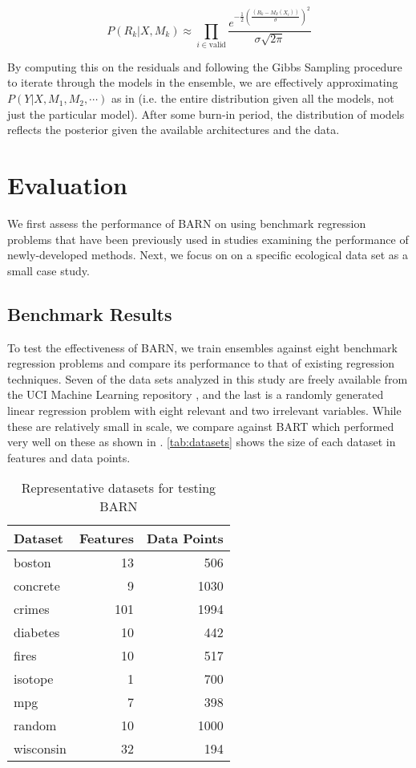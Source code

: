 \documentclass[12pt]{article}
\begin{document}
$$
P(R_k|X,M_k) \approx \prod_{i \in \text{valid}} \frac{e^{-\frac{1}{2}\left(\frac{(R_k-M_k(X_i))}{\sigma}\right)^2}}{\sigma \sqrt{2\pi}}
$$

By computing this on the residuals and following the Gibbs Sampling procedure to iterate through the models in the ensemble, we are effectively approximating $P(Y|X,M_1,M_2,\cdots)$ as in \cite{chipman2010bart} (i.e. the entire distribution given all the models, not just the particular model).  After some burn-in period, the distribution of models reflects the posterior given the available architectures and the data.

\section{Evaluation}\label{sec:eval}

We first assess the performance of BARN on using benchmark regression problems that have been previously used in studies examining the performance of newly-developed methods. Next, we focus on on a specific ecological data set as a small case study.

\subsection{Benchmark Results}\label{subsec:res}

To test the effectiveness of BARN, we train ensembles against eight benchmark regression problems and compare its performance to that of existing regression techniques.  Seven of the data sets analyzed in this study are freely available from the UCI Machine Learning repository \cite{Dua:2019}, and the last is a randomly generated linear regression problem with eight relevant and two irrelevant variables.  While these are relatively small in scale, we compare against BART which performed very well on these as shown in \cite{biau2019neural}.  \autoref{tab:datasets} shows the size of each dataset in features and data points.

\begin{table}[htb]
\centering
\caption{Representative datasets for testing BARN}
\begin{tabular}{lrr}
Dataset & Features & Data Points\\ \hline
boston & 13 & 506\\
concrete & 9 & 1030\\
crimes & 101 & 1994\\
diabetes & 10 & 442 \\
fires & 10 & 517\\
isotope & 1 & 700 \\
mpg & 7 & 398\\
random & 10 & 1000 \\
wisconsin & 32 & 194\\
\end{tabular}
    \label{tab:datasets}
\end{table}
\end{document}
